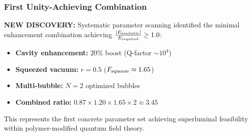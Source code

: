 \documentclass[11pt]{article}
\begin{document}
\subsubsection*{First Unity-Achieving Combination}
\textbf{NEW DISCOVERY:} Systematic parameter scanning identified the minimal enhancement combination achieving $\frac{|E_{\rm available}|}{E_{\rm required}} \geq 1.0$:
\begin{itemize}
  \item \textbf{Cavity enhancement:} $20\%$ boost (Q-factor $\sim 10^4$)
  \item \textbf{Squeezed vacuum:} $r = 0.5$ ($F_{\rm squeeze} \approx 1.65$)
  \item \textbf{Multi-bubble:} $N = 2$ optimized bubbles
  \item \textbf{Combined ratio:} $0.87 \times 1.20 \times 1.65 \times 2 \approx 3.45$
\end{itemize}

This represents the first concrete parameter set achieving superluminal feasibility within polymer-modified quantum field theory.
\end{document}
